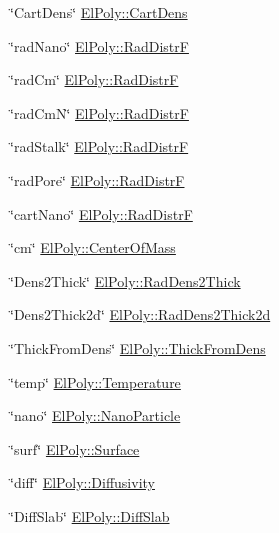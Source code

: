 \begin{DoxyItemize}
\item \char`\"{}\-Cart\-Dens\char`\"{} \hyperlink{classElPoly_ac946a8b29f4eec0816699ce0c0cac23c}{\-El\-Poly\-::\-Cart\-Dens} 
\item \char`\"{}rad\-Nano\char`\"{} \hyperlink{classElPoly_aff852b942203d47f2e21e2616537cbdd}{\-El\-Poly\-::\-Rad\-Distr\-F} 
\item \char`\"{}rad\-Cm\char`\"{} \hyperlink{classElPoly_aff852b942203d47f2e21e2616537cbdd}{\-El\-Poly\-::\-Rad\-Distr\-F} 
\item \char`\"{}rad\-Cm\-N\char`\"{} \hyperlink{classElPoly_aff852b942203d47f2e21e2616537cbdd}{\-El\-Poly\-::\-Rad\-Distr\-F} 
\item \char`\"{}rad\-Stalk\char`\"{} \hyperlink{classElPoly_aff852b942203d47f2e21e2616537cbdd}{\-El\-Poly\-::\-Rad\-Distr\-F} 
\item \char`\"{}rad\-Pore\char`\"{} \hyperlink{classElPoly_aff852b942203d47f2e21e2616537cbdd}{\-El\-Poly\-::\-Rad\-Distr\-F} 
\item \char`\"{}cart\-Nano\char`\"{} \hyperlink{classElPoly_aff852b942203d47f2e21e2616537cbdd}{\-El\-Poly\-::\-Rad\-Distr\-F} 
\item \char`\"{}cm\char`\"{} \hyperlink{classElPoly_a59529de9a660df4734a218130963ae25}{\-El\-Poly\-::\-Center\-Of\-Mass} 
\item \char`\"{}\-Dens2\-Thick\char`\"{} \hyperlink{classElPoly_a7c40fb501bdadab09ee7cf8d99259299}{\-El\-Poly\-::\-Rad\-Dens2\-Thick} 
\item \char`\"{}\-Dens2\-Thick2d\char`\"{} \hyperlink{classElPoly_ad5ab39cdaa856caea3463819b436e7b9}{\-El\-Poly\-::\-Rad\-Dens2\-Thick2d} 
\item \char`\"{}\-Thick\-From\-Dens\char`\"{} \hyperlink{classElPoly_abcf175509352ac9dd90cb8ad96494219}{\-El\-Poly\-::\-Thick\-From\-Dens} 
\item \char`\"{}temp\char`\"{} \hyperlink{classElPoly_ad0651bcc7574507f16c1998b57822bdd}{\-El\-Poly\-::\-Temperature} 
\item \char`\"{}nano\char`\"{} \hyperlink{classElPoly_af9a89c5f8dc4c7274ec5e00ff4db78bb}{\-El\-Poly\-::\-Nano\-Particle} 
\item \char`\"{}surf\char`\"{} \hyperlink{classElPoly_a52844d3cee2d60eb47889fb021e10fc8}{\-El\-Poly\-::\-Surface} 
\item \char`\"{}diff\char`\"{} \hyperlink{classElPoly_a2f4aa8dc1e4dce0dc8fcb1d4b161757b}{\-El\-Poly\-::\-Diffusivity} 
\item \char`\"{}\-Diff\-Slab\char`\"{} \hyperlink{classElPoly_abf879a7d0b86a5eed8a5be87dc741200}{\-El\-Poly\-::\-Diff\-Slab} 

\end{DoxyItemize}
